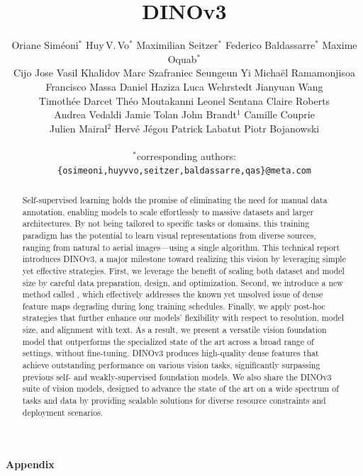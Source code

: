 \documentclass[10pt]{article} %
\title{\centering DINOv3}
\author{
    \centering
    Oriane Siméoni$^*$\hfill
    Huy\,V.\,Vo$^*$\hfill
    Maximilian Seitzer$^*$\hfill
    Federico Baldassarre$^*$\hfill
    Maxime Oquab$^*$\\[0.25em]
    Cijo Jose\hspace{1em}
    Vasil Khalidov\hspace{1em}
    Marc Szafraniec\hspace{1em}
    Seungeun Yi\hspace{1em}
    Michaël Ramamonjisoa\\[0.25em]
    Francisco Massa\hspace{2.25em}
    Daniel Haziza\hspace{2.25em}
    Luca Wehrstedt\hspace{2.25em}
    Jianyuan Wang \\[0.25em]
    Timothée Darcet\hspace{1.1em}
    Théo Moutakanni\hspace{1.1em}
    Leonel Sentana\hspace{1.1em}
    Claire Roberts\\[0.25em]
    Andrea Vedaldi\hspace{1.25em}
    Jamie Tolan\hspace{1.25em}
    John Brandt$^1$\hspace{1.25em}
    Camille Couprie\\[0.25em]
    Julien Mairal$^2$\hspace{0.7em}
    Hervé Jégou\hspace{1.1em}
    Patrick Labatut\hspace{0.9em}
    Piotr Bojanowski \\
    \normalfont
    \vspace{0.75em}
    \addr{Meta AI Research} $\;\;\;\;\;\;\;\;$ \addr{$^1$WRI} $\;\;\;\;\;\;\;\;$ \addr{$^2$Inria} \\
    \vspace{0.75em}
    \small{$^*$corresponding authors: \texttt{\{osimeoni,huyvvo,seitzer,baldassarre,qas\}@meta.com}}
}
\date{}
\begin{document}
\maketitle

\begin{abstract}


Self-supervised learning holds the promise of eliminating the need for manual data annotation, enabling models to scale effortlessly to massive datasets and larger architectures. 
By not being tailored to specific tasks or domains, this training paradigm has the potential to learn visual representations from diverse sources, ranging from natural to aerial images---using a single algorithm. 
This technical report introduces DINOv3, a major milestone toward realizing this vision by leveraging simple yet effective strategies. 
First, we leverage the benefit of scaling both dataset and model size by careful data preparation, design, and optimization. 
Second, we introduce a new method called \gramname, which effectively addresses the known yet unsolved issue of dense feature maps degrading during long training schedules. 
Finally, we apply post-hoc strategies that further enhance our models' flexibility with respect to resolution, model size, and alignment with text.
As a result, we present a versatile vision foundation model that outperforms the specialized state of the art across a broad range of settings, without fine-tuning.
DINOv3 produces high-quality dense features that achieve outstanding performance on various vision tasks, significantly surpassing previous self- and weakly-supervised foundation models.
We also share the DINOv3 suite of vision models, designed to advance the state of the art on a wide spectrum of tasks and data by providing scalable solutions for diverse resource constraints and deployment scenarios. 

\end{abstract}














\clearpage




\clearpage
\appendix

{\Large\textbf{Appendix}}
\FloatBarrier





\end{document}
